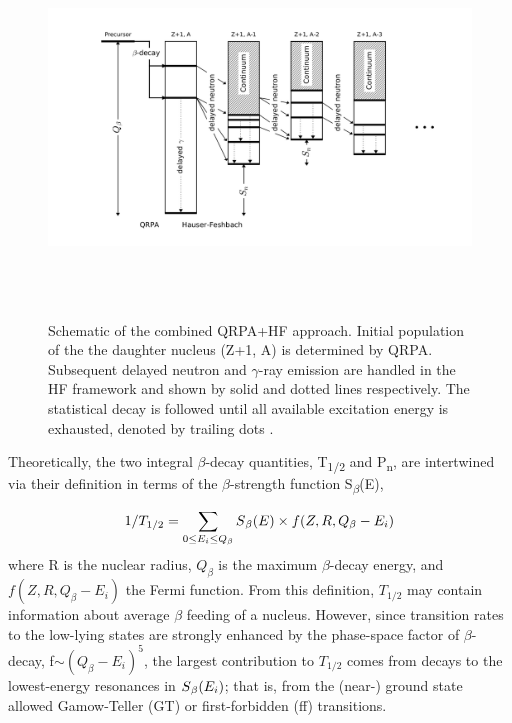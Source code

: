 \begin{figure}[h]
	\centering
	\includegraphics[width=17cm, height=10cm]{figures/delayed_netron_emission_cascaade.png}
	\caption[Schematic of the combined QRPA+HF approach]{Schematic of the combined QRPA+HF approach. Initial population of the the daughter nucleus (Z+1, A) is determined by QRPA. Subsequent delayed neutron and $\gamma$-ray emission are handled in the HF framework and shown by solid and dotted lines respectively. The statistical decay is followed until all available excitation energy is exhausted, denoted by trailing dots \citep{moller2016}. }
\end{figure}

Theoretically, the two integral $\beta$-decay quantities, T\textsubscript{1/2} and P\textsubscript{n}, are intertwined via their definition in terms of the $\beta$-strength function S\textsubscript{$\beta$}(E),

\begin{equation}
1/T_{1/2}=\sum_{0\leq E_{i}\leq Q_{\beta}}S\textsubscript{$\beta$}(E)  \times f(Z,R,Q_{\beta}-E_{i})
\end{equation}
where R is the nuclear radius, $Q_{\beta}$ is the maximum $\beta$-decay energy, and $f(Z,R,Q_{\beta}-E_{i})$ the Fermi function. From this definition, $T_{1/2}$ may contain information about average $\beta$ feeding of a nucleus. However, since transition rates to the low-lying states are strongly enhanced by the phase-space factor of $\beta$-decay, f$\sim (Q_{\beta}- E_{i})^5$, the largest contribution to $T_{1/2}$ comes from decays to the lowest-energy resonances in $S\textsubscript{$\beta$}(E_{i})$; that is, from the (near-) ground state allowed Gamow-Teller (GT) or first-forbidden (ff) transitions.

